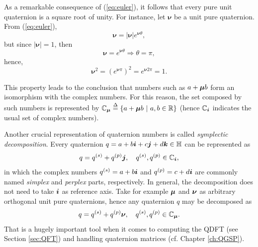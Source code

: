 As a remarkable consequence of (\ref{eq:euler}), it follows that every pure unit quaternion is a square root of unity. For instance, let $ \mathbf{\nu} $ be a unit pure quaternion. From (\ref{eq:euler}),
\begin{equation}
\mathbf{\nu} = |\mathbf{\nu}| e^{\mathbf{\nu} \theta},
\end{equation}
but since $ |\mathbf{\nu}| = 1 $, then
\begin{equation}
\mathbf{\nu} = e^{\mathbf{\nu} \theta} \Rightarrow \theta = \pi,
\end{equation}
hence,
\begin{equation}
\mathbf{\nu}^2 = \left( e^{\mathbf{\nu}\pi} \right)^2 = e^{\mathbf{\nu} 2\pi} = 1.
\end{equation}

This property leads to the conclusion that numbers such as $ a + \boldsymbol{\mu} b  $ form an isomorphism with the complex numbers. For this reason, the set composed by such numbers is represented by $ \mathbb{C}_{\boldsymbol{\mu}} \overset{\Delta}{=} \{ a + \boldsymbol{\mu} b \ |\  a, b \in \mathbb{R} \}$ (hence $ \mathbb{C}_{\boldsymbol{i}} $ indicates the usual set of complex numbers).

Another crucial representation of quaternion numbers is called \emph{symplectic decomposition}. Every quaternion $ q = a + b\boldsymbol{i} + c\boldsymbol{j} + d\boldsymbol{k} \in \mathbb{H} $ can be represented as
\begin{equation}
q = q^{(s)} + q^{(p)} \boldsymbol{j}, \quad q^{(s)}, q^{(p)} \in \mathbb{C}_{\boldsymbol{i}},
\end{equation}
in which the complex numbers $ q^{(s)} = a + b\boldsymbol{i} $ and $ q^{(p)} = c + d\boldsymbol{i} $ are commonly named \emph{simplex} and \emph{perplex} parts, respectively. In general, the decomposition does not need to take $\boldsymbol{i}$ as reference axis. Take for example $ \boldsymbol{\mu} $ and $ \boldsymbol{\nu} $ as arbitrary orthogonal unit pure quaternions, hence any quaternion $ q $ may be decomposed as
\begin{equation}
\label{eq:decomposicao}
q = q^{(s)} + q^{(p)} \boldsymbol{\nu}, \quad q^{(s)}, q^{(p)} \in \mathbb{C}_{\boldsymbol{\mu}}.
\end{equation}
That is a hugely important tool when it comes to computing the QDFT (see Section \ref{sec:QFT}) and handling quaternion matrices (cf. Chapter \ref{ch:QGSP}).


